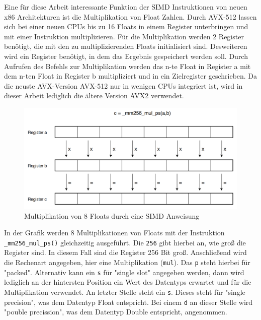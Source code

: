 \documentclass[../main.tex]{subfiles}
\begin{document}
Eine für diese Arbeit interessante Funktion der SIMD Instruktionen von neuen x86 Architekturen ist die Multiplikation von Float Zahlen. Durch AVX-512 lassen sich bei einer neuen CPUs bis zu 16 Floats in einem Register unterbringen und mit einer Instruktion multiplizieren. Für die Multiplikation werden 2 Register benötigt, die mit den zu multiplizierenden Floats initialisiert sind. Desweiteren wird ein Register benötigt, in dem das Ergebnis gespeichert werden soll. Durch Aufrufen des Befehls zur Multiplikation werden das n-te Float in Register a mit dem n-ten Float in Register b multipliziert und in ein Zielregister geschrieben.
Da die neuste AVX-Version AVX-512 nur in wenigen CPUs integriert ist, wird in dieser Arbeit lediglich die ältere Version AVX2 verwendet.

\begin{figure}[!htbp]
	\centering
	\includegraphics[width=\textwidth]{../images/Benz/avx.png}
	\caption{Multiplikation von 8 Floats durch eine SIMD Anweisung} 
	\label{fig:avx}
\end{figure}

In der Grafik werden 8 Multiplikationen von Floats mit der Instruktion \linebreak  \texttt{\_mm256\_mul\_ps()} gleichzeitig ausgeführt. Die \texttt{256} gibt hierbei an, wie groß die Register sind. In diesem Fall sind die Register 256 Bit groß. Anschließend wird die Rechenart angegeben, hier eine Multiplikation (\texttt{mul}). Das \texttt{p} steht hierbei für "packed". Alternativ kann ein \texttt{s} für "single slot" angegeben werden, dann wird lediglich an der hintersten Position ein Wert des Datentyps erwartet und für die Multiplikation verwendet. An letzter Stelle steht ein \texttt{s}. Dieses steht für "single precision", was dem Datentyp Float entspricht. Bei einem \texttt{d} an dieser Stelle wird "pouble precission", was dem Datentyp Double entspricht, angenommen.
\end{document}
